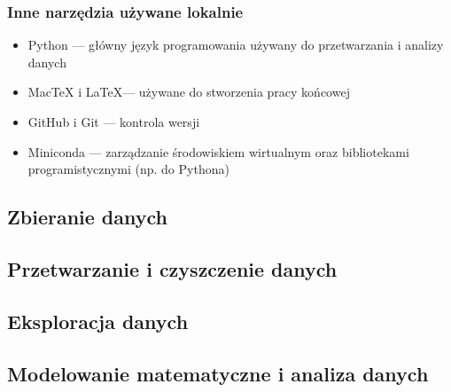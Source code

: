 \documentclass[12pt, a4paper]{article}
\begin{document}
\subsubsection{Inne narzędzia używane lokalnie}
\begin{itemize}
    \item Python --- główny język programowania używany do przetwarzania i analizy danych
    \item MacTeX i \LaTeX --- używane do stworzenia pracy końcowej
    \item GitHub i Git --- kontrola wersji
    \item Miniconda --- zarządzanie środowiskiem wirtualnym oraz bibliotekami programistycznymi (np. do Pythona)
\end{itemize}


\subsection{Zbieranie danych}

\subsection{Przetwarzanie i czyszczenie danych}


\subsection{Eksploracja danych}
\subsection{Modelowanie matematyczne i analiza danych}
\end{document}
